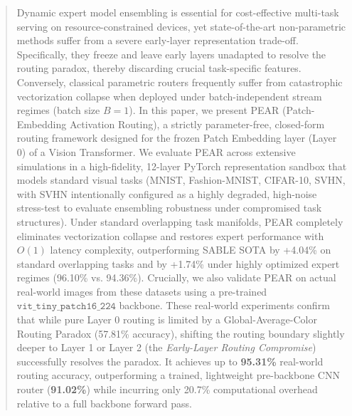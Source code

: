 \begin{abstract}
  Dynamic expert model ensembling is essential for cost-effective multi-task serving on resource-constrained devices, yet state-of-the-art non-parametric methods suffer from a severe early-layer representation trade-off. Specifically, they freeze and leave early layers unadapted to resolve the routing paradox, thereby discarding crucial task-specific features. Conversely, classical parametric routers frequently suffer from catastrophic vectorization collapse when deployed under batch-independent stream regimes (batch size $B=1$). In this paper, we present PEAR (Patch-Embedding Activation Routing), a strictly parameter-free, closed-form routing framework designed for the frozen Patch Embedding layer (Layer 0) of a Vision Transformer. We evaluate PEAR across extensive simulations in a high-fidelity, 12-layer PyTorch representation sandbox that models standard visual tasks (MNIST, Fashion-MNIST, CIFAR-10, SVHN, with SVHN intentionally configured as a highly degraded, high-noise stress-test to evaluate ensembling robustness under compromised task structures). Under standard overlapping task manifolds, PEAR completely eliminates vectorization collapse and restores expert performance with $O(1)$ latency complexity, outperforming SABLE SOTA by +4.04\% on standard overlapping tasks and by +1.74\% under highly optimized expert regimes (96.10\% vs. 94.36\%). Crucially, we also validate PEAR on actual real-world images from these datasets using a pre-trained $\mathtt{vit\_tiny\_patch16\_224}$ backbone. These real-world experiments confirm that while pure Layer 0 routing is limited by a Global-Average-Color Routing Paradox (57.81\% accuracy), shifting the routing boundary slightly deeper to Layer 1 or Layer 2 (the \emph{Early-Layer Routing Compromise}) successfully resolves the paradox. It achieves up to \textbf{95.31\%} real-world routing accuracy, outperforming a trained, lightweight pre-backbone CNN router (\textbf{91.02\%}) while incurring only 20.7\% computational overhead relative to a full backbone forward pass.
\end{abstract}
